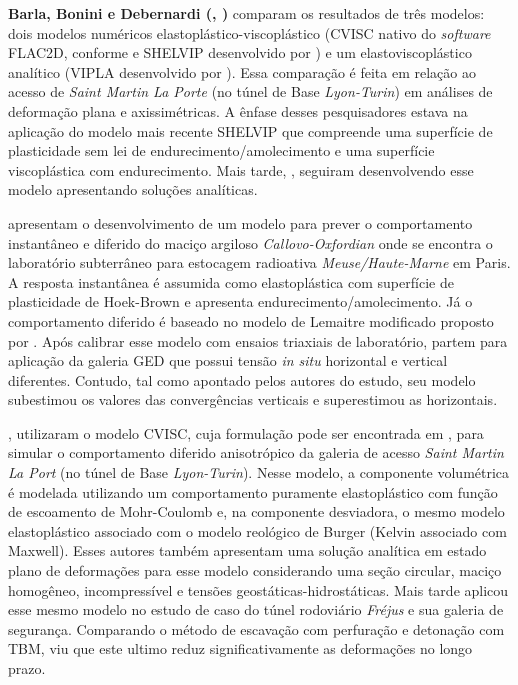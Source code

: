 \textbf{Barla, Bonini e Debernardi (\citeyear{Barla2008}, \citeyear{Barla2010})} comparam os resultados de três modelos: dois modelos numéricos elastoplástico-viscoplástico (CVISC nativo do \textit{software} FLAC2D, conforme  e SHELVIP desenvolvido por ) e um elastoviscoplástico analítico (VIPLA desenvolvido por ). Essa comparação é feita em relação ao acesso de \textit{Saint Martin La Porte} (no túnel de Base \textit{Lyon-Turin}) em análises de deformação plana e axissimétricas. A ênfase desses pesquisadores estava na aplicação do modelo mais recente SHELVIP que compreende uma superfície de plasticidade sem lei de endurecimento/amolecimento e uma superfície viscoplástica com endurecimento. Mais tarde, , seguiram desenvolvendo esse modelo apresentando soluções analíticas.

\textbf{} apresentam o desenvolvimento de um modelo para prever o comportamento instantâneo e diferido do maciço argiloso \textit{Callovo-Oxfordian} onde se encontra o laboratório subterrâneo para estocagem radioativa \textit{Meuse/Haute-Marne} em Paris. A resposta instantânea é assumida como elastoplástica com superfície de plasticidade de Hoek-Brown e apresenta endurecimento/amolecimento. Já o comportamento diferido é baseado no modelo de Lemaitre modificado proposto por . Após calibrar esse modelo com ensaios triaxiais de laboratório, partem para aplicação da galeria GED que possui tensão \textit{in situ} horizontal e vertical diferentes. Contudo, tal como apontado pelos autores do estudo, seu modelo subestimou os valores das convergências verticais e superestimou as horizontais.

\textbf{}, utilizaram o modelo CVISC, cuja formulação pode ser encontrada em , para simular o comportamento diferido anisotrópico da galeria de acesso \textit{Saint Martin La Port} (no túnel de Base \textit{Lyon-Turin}). Nesse modelo, a componente volumétrica é modelada utilizando um comportamento puramente elastoplástico com função de escoamento de Mohr-Coulomb e, na componente desviadora, o mesmo modelo elastoplástico associado com o modelo reológico de Burger (Kelvin associado com Maxwell). Esses autores também apresentam uma solução analítica em estado plano de deformações para esse modelo considerando uma seção circular, maciço homogêneo, incompressível e tensões geostáticas-hidrostáticas. Mais tarde  aplicou esse mesmo modelo no estudo de caso do túnel rodoviário \textit{Fréjus} e sua galeria de segurança. Comparando o método de escavação com perfuração e detonação com TBM, viu que este ultimo reduz significativamente as deformações no longo prazo.


